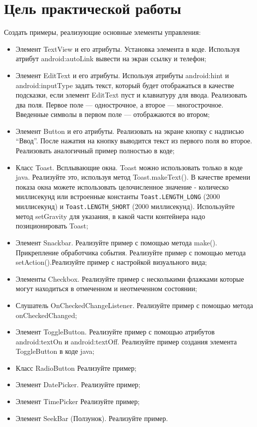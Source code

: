 \graphicspath{{~/Documents/MobAppDev/fifth/img}}
\section*{\LARGE{Цель практической работы}}
Создать примеры, реализующие основные элементы управления:

\begin{itemize}
	\item Элемент TextView и его атрибуты. Установка элемента в коде.
		Используя атрибут android:autoLink вывести на экран ссылку и телефон;
	\item Элемент EditText и его атрибуты. Используя атрибуты
		android:hint и android:inputType задать текст, который будет
		отображаться в качестве подсказки, если элемент EditText пуст
		и клавиатуру для ввода. Реализовать два поля.
		Первое поле --- однострочное, а второе --- многострочное.
		Введенные символы в первом поле --- отображаются во втором;
	\item Элемент Button и его атрибуты. Реализовать на экране кнопку с
		надписью “Ввод”. После нажатия на кнопку выводится текст из первого
		поля во второе. Реализовать аналогичный пример полностью в коде;
	\item Класс Toast. Всплывающие окна. Toast можно использовать
		только в коде java. Реализуйте это, используя метод Toast.makeText().
		В качестве времени показа окна можете использовать целочисленное
		значение - колическо миллисекунд или встроенные константы
		\verb|Toast.LENGTH_LONG| (2000 миллисекунд)
		и \verb|Toast.LENGTH_SHORT| (2000 миллисекунд).
		Используйте метод setGravity для указания, в какой части
		контейнера надо позиционировать Toast;
	\item Элемент Snackbar. Реализуйте пример с помощью метода make().
		Прикрепление обработчика события. Реализуйте пример с помощью метода
		setAction().Реализуйте пример с настройкой визуального вида;
	\item Элементы Checkbox. Реализуйте пример с несколькими
		флажками которые могут находиться в отмеченном и неотмеченном
		состоянии;
	\item Слушатель OnCheckedChangeListener. Реализуйте пример с
		помощью метода onCheckedChanged;
	\item Элемент ToggleButton. Реализуйте пример с помощью атрибутов
		android:textOn и android:textOff. Реализуйте пример создания элемента
		ToggleButton в коде java;
	\item Класс RadioButton Реализуйте пример;
	\item Элемент DatePicker. Реализуйте пример;
	\item Элемент TimePicker Реализуйте пример;
	\item Элемент SeekBar (Ползунок). Реализуйте пример.
\end{itemize}

